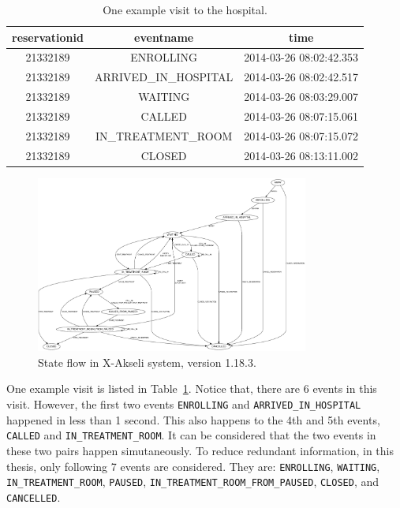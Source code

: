 \begin{table}
	\caption{One example visit to the hospital.}
	\label{table:example}
	\begin{tabular}{|c|c|c|}
		\hline
		 reservationid &      eventname      &          time	\\ \hline

	      21332189 & ENROLLING           & 2014-03-26 08:02:42.353	\\ \hline
	      21332189 & ARRIVED\_IN\_HOSPITAL & 2014-03-26 08:02:42.517	\\ \hline
    	  21332189 & WAITING             & 2014-03-26 08:03:29.007	\\ \hline
	      21332189 & CALLED              & 2014-03-26 08:07:15.061	\\ \hline
    	  21332189 & IN\_TREATMENT\_ROOM   & 2014-03-26 08:07:15.072	\\ \hline
	      21332189 & CLOSED              & 2014-03-26 08:13:11.002	\\ \hline
	\end{tabular}
\end{table}

\begin{figure}
	\begin{center}
		\includegraphics[width=0.8\textwidth]{images/patientFsm}
		\caption{State flow in X-Akseli system, version 1.18.3.}
		\label{fig:state}
	\end{center}
\end{figure}

One example visit is listed in Table~\ref{table:example}. Notice that, there are 6 events in this visit. However, the first two events \texttt{ENROLLING} and  \texttt{ARRIVED\_IN\_HOSPITAL} happened in less than 1 second. This also happens to the 4th and 5th events, \texttt{CALLED} and \texttt{IN\_TREATMENT\_ROOM}. It can be considered that the two events in these two pairs happen simutaneously. To reduce redundant information, in this thesis, only following 7 events are considered. They are: \texttt{ENROLLING}, \texttt{WAITING}, \texttt{IN\_TREATMENT\_ROOM}, \texttt{PAUSED}, \texttt{IN\_TREATMENT\_ROOM\_FROM\_PAUSED}, \texttt{CLOSED}, and \texttt{CANCELLED}.

